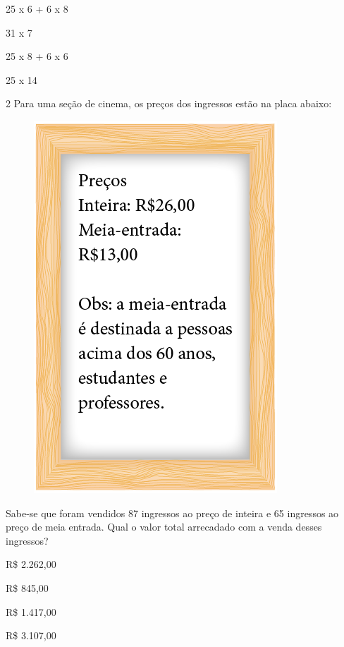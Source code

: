 \begin{minipage}{.5\textwidth}
\begin{escolha}
\item
  25 x 6 + 6 x 8
\item
  31 x 7
\item
  25 x 8 + 6 x 6
\item
  25 x 14
\end{escolha}
\end{minipage}



\num{2} Para uma seção de cinema, os preços dos ingressos estão na placa
abaixo:

\begin{figure}[htpb!]
\centering
\includegraphics[width=.4\textwidth]{../ilustracoes/MAT5/SAEB_5ANO_MAT_figura93.png}
\end{figure}

Sabe-se que foram vendidos 87 ingressos ao preço de inteira e 65
ingressos ao preço de meia entrada. Qual o valor total arrecadado com a
venda desses ingressos?

\begin{minipage}{.5\textwidth}
\begin{escolha}
\item
  R\$ 2.262,00
\item
  R\$ 845,00
\item
  R\$ 1.417,00
\item
  R\$ 3.107,00
\end{escolha}
\end{minipage}

